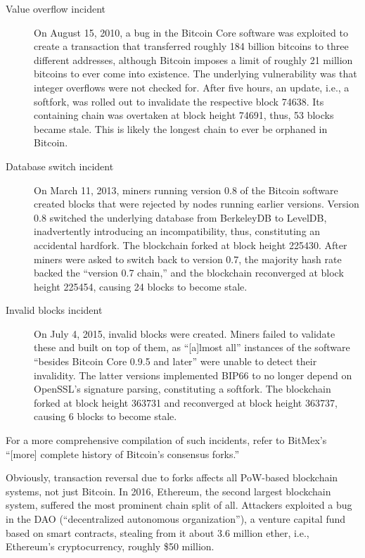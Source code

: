 \begin{description}
\item[Value overflow incident]
On August 15, 2010, a bug in the Bitcoin Core software was exploited to create a transaction that transferred roughly 184 billion bitcoins to three different addresses, although Bitcoin imposes a limit of roughly 21 million bitcoins to ever come into existence.
The underlying vulnerability was that integer overflows were not checked for.
After five hours, an update, i.e., a softfork, was rolled out to invalidate the respective block 74638.
Its containing chain was overtaken at block height 74691, thus, 53 blocks became stale.
\autocite{bitcoinwiki2016valueoverflowincident}
This is likely the longest chain to ever be orphaned in Bitcoin.
\item[Database switch incident]
On March 11, 2013, miners running version 0.8 of the Bitcoin software created blocks that were rejected by nodes running earlier versions.
Version 0.8 switched the underlying database from BerkeleyDB to LevelDB, inadvertently introducing an incompatibility, thus, constituting an accidental hardfork.
The blockchain forked at block height 225430.
After miners were asked to switch back to version 0.7, the majority hash rate backed the ``version 0.7 chain,'' and the blockchain reconverged at block height 225454, causing 24 blocks to become stale.
\autocite{buterin2013}
\item[Invalid blocks incident]
On July 4, 2015, invalid blocks were created.
Miners failed to validate these and built on top of them, as ``[a]lmost all''  instances of the software ``besides Bitcoin Core 0.9.5 and later'' were unable to detect their invalidity. \autocite{bitcoin2015invalidblocks}
The latter versions implemented BIP66 \autocite{github2015bip66} to no longer depend on OpenSSL's signature parsing, constituting a softfork.
The blockchain forked at block height 363731 and reconverged at block height 363737, causing 6 blocks to become stale.
\autocite{rbitcoin2015invalidblocks}
\end{description}

For a more comprehensive compilation of such incidents, refer to BitMex's ``[more] complete history of Bitcoin's consensus forks.'' \autocite{bitmex2262}

Obviously, transaction reversal due to forks affects all PoW-based blockchain systems, not just Bitcoin.
In 2016, Ethereum, the second largest blockchain system, suffered the most prominent chain split of all.
Attackers exploited a bug in the DAO (``decentralized autonomous organization''), a venture capital fund based on smart contracts, stealing from it about 3.6 million ether, i.e., Ethereum's cryptocurrency, roughly \$50 million. \autocite[75]{dhillon2017}

